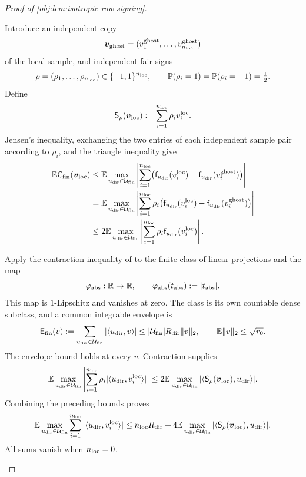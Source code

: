 \documentclass[11pt]{article}
\begin{document}
\begin{proof}[Proof of \cref{obj:lem:isotropic-row-signing}]
\begin{enumerate}
Introduce an independent copy
\[
\boldsymbol v_{\rm ghost}
=(v^{\rm ghost}_1,\ldots,v^{\rm ghost}_{n_{\rm loc}})
\]
of the local sample, and independent fair signs
\[
\rho=(\rho_1,\ldots,\rho_{n_{\rm loc}})
\in\{-1,1\}^{n_{\rm loc}},
\qquad
\mathbb P(\rho_i=1)=\mathbb P(\rho_i=-1)=\tfrac12.
\]
Define
\[
\mathsf S_\rho(\boldsymbol v_{\rm loc})
:=\sum_{i=1}^{n_{\rm loc}}\rho_i v_i^{\rm loc}.
\]
Jensen's inequality, exchanging the two entries of each independent sample pair according to \(\rho_i\), and the triangle inequality give
\[
\begin{aligned}
\mathbb E\mathsf C_{\rm fin}(\boldsymbol v_{\rm loc})
&\leq
\mathbb E\max_{u_{\rm dir}\in\mathcal U_{\rm fin}}
\left|\sum_{i=1}^{n_{\rm loc}}
\bigl(\mathsf f_{u_{\rm dir}}(v_i^{\rm loc})
-\mathsf f_{u_{\rm dir}}(v_i^{\rm ghost})\bigr)\right|\\
&=
\mathbb E\max_{u_{\rm dir}\in\mathcal U_{\rm fin}}
\left|\sum_{i=1}^{n_{\rm loc}}\rho_i
\bigl(\mathsf f_{u_{\rm dir}}(v_i^{\rm loc})
-\mathsf f_{u_{\rm dir}}(v_i^{\rm ghost})\bigr)\right|\\
&\leq
2\mathbb E\max_{u_{\rm dir}\in\mathcal U_{\rm fin}}
\left|\sum_{i=1}^{n_{\rm loc}}\rho_i
\mathsf f_{u_{\rm dir}}(v_i^{\rm loc})\right|.
\end{aligned}
\]

Apply the contraction inequality of
\citep[Theorem~12(4), with Rademacher complexity as in Definition~2]{BartlettMendelson2002Complexities}
to the finite class of linear projections and the map
\[
\varphi_{\rm abs}:\mathbb R\to\mathbb R,
\qquad
\varphi_{\rm abs}(t_{\rm abs}):=|t_{\rm abs}|.
\]
This map is \(1\)-Lipschitz and vanishes at zero. The class is its own countable dense subclass, and a common integrable envelope is
\[
\mathsf E_{\rm fin}(v)
:=\sum_{u_{\rm dir}\in\mathcal U_{\rm fin}}
|\langle u_{\rm dir},v\rangle|
\leq|\mathcal U_{\rm fin}|R_{\rm dir}\|v\|_2,
\qquad
\mathbb E\|v\|_2\leq\sqrt{r_0}.
\]
The envelope bound holds at every \(v\). Contraction supplies
\[
\mathbb E\max_{u_{\rm dir}\in\mathcal U_{\rm fin}}
\left|\sum_{i=1}^{n_{\rm loc}}\rho_i
|\langle u_{\rm dir},v_i^{\rm loc}\rangle|\right|
\leq
2\mathbb E\max_{u_{\rm dir}\in\mathcal U_{\rm fin}}
|\langle \mathsf S_\rho(\boldsymbol v_{\rm loc}),u_{\rm dir}\rangle|.
\]
Combining the preceding bounds proves
\[
\mathbb E\max_{u_{\rm dir}\in\mathcal U_{\rm fin}}
\sum_{i=1}^{n_{\rm loc}}|\langle u_{\rm dir},v_i^{\rm loc}\rangle|
\leq n_{\rm loc}R_{\rm dir}
+4\mathbb E\max_{u_{\rm dir}\in\mathcal U_{\rm fin}}
|\langle \mathsf S_\rho(\boldsymbol v_{\rm loc}),u_{\rm dir}\rangle|.
\]
All sums vanish when \(n_{\rm loc}=0\).


\end{enumerate}
\end{proof}
\end{document}
